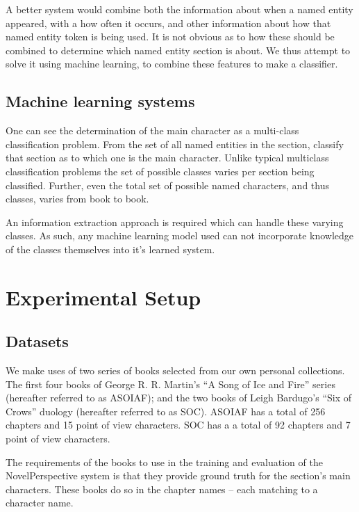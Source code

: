 \documentclass[11pt,a4paper]{article}
\begin{document}
A better system would combine both the information about when a named entity appeared,
with a how often it occurs, and other information about how that named entity token is being used.
It is not obvious as to how these should be combined to determine which named entity section is about.
We thus attempt to solve it using machine learning, to combine these features to make a classifier.

\subsection{Machine learning systems}
One can see the determination of the main character as a multi-class classification problem.
From the set of all named entities in the section, classify that section as to which one is the main character.
Unlike typical multiclass classification problems
the set of possible classes varies per section being classified.
Further, even the total set of possible named characters, and thus classes, varies from book to book.

An information extraction approach is required which can handle these varying classes.
As such, any machine learning model used can not incorporate knowledge of the classes themselves into it's learned system.








\section{Experimental Setup}\label{sec:experimental-setup}
\subsection{Datasets}
We make uses of two series of books selected from our own personal collections.
The first four books of George R. R. Martin's ``A Song of Ice and Fire'' series (hereafter referred to as ASOIAF);
and the two books of  Leigh Bardugo's ``Six of Crows'' duology (hereafter referred to as SOC).
ASOIAF has a total of 256 chapters and 15 point of view characters.
SOC has a a total of 92 chapters and 7  point of view characters.

The requirements of the books to use in the training and evaluation of the NovelPerspective system is that they provide ground truth for the section's main characters.
These books do so in the chapter names -- each matching to a character name.
\end{document}

